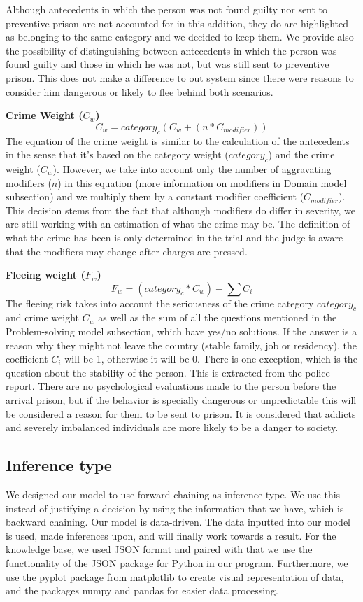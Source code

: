 \documentclass{article}
\begin{document}
Although antecedents in which the person was not found guilty nor sent to preventive prison are not accounted for in this addition, they do are highlighted as belonging to the same category and we decided to keep them. We provide also the possibility of distinguishing between antecedents in which the person was found guilty and those in which he was not, but was still sent to preventive prison. This does not make a difference to out system since there were reasons to consider him dangerous or likely to flee behind both scenarios.

\textbf{Crime Weight ($C_w$)}
\begin{equation}
    C_w= category_c (C_w + (n *C_{modifier}))
\end{equation}
The equation of the crime weight is similar to the calculation of the antecedents in the sense that it's based on the category weight ($category_c$) and the crime weight ($C_w$). However, we take into account only the number of aggravating modifiers ($n$) in this equation (more information on modifiers in Domain model subsection) and we multiply them by a constant modifier coefficient ($C_{modifier}$).
This decision stems from the fact that although modifiers do differ in severity, we are still working with an estimation of what the crime may be. The definition of what the crime has been is only determined in the trial and the judge is aware that the modifiers may change after charges are pressed. 

\textbf{Fleeing weight ($F_w$)}
\begin{equation}
    F_w= (category_c*C_w) - \sum C_i
\end{equation}
The fleeing risk takes into account the seriousness of the crime category $category_c$ and crime weight $C_w$ as well as the sum of all the questions mentioned in the Problem-solving model subsection, which have yes/no solutions. If the answer is a reason why they might not leave the country (stable family, job or residency), the coefficient $C_i$ will be 1, otherwise it will be 0. There is one exception, which is the question about the stability of the person. This is extracted from the police report. There are no psychological evaluations made to the person before the arrival prison, but if the behavior is specially dangerous or unpredictable this will be considered a reason for them to be sent to prison. It is considered that addicts and severely imbalanced individuals are more likely to be a danger to society.

\subsection{Inference type}
We designed our model to use forward chaining as inference type. We use this instead of justifying a decision by using the information that we have, which is backward chaining. Our model is data-driven. The data inputted into our model is used, made inferences upon, and will finally work towards a result. For the knowledge base, we used JSON format and paired with that we use the functionality of the JSON package for Python in our program. Furthermore, we use the pyplot package from matplotlib to create visual representation of data, and the packages numpy and pandas for easier data processing. 
\end{document}
